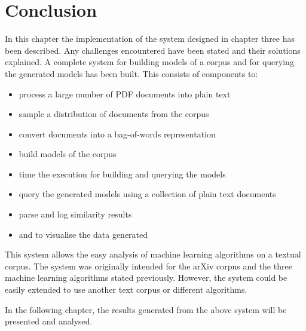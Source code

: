 \section{Conclusion}
In this chapter the implementation of the system designed in chapter three has been described.
Any challenges encountered have been stated and their solutions explained.
A complete system for building models of a corpus and for querying the generated models has been built.
This consists of components to:
\begin{itemize}
    \item process a large number of PDF documents into plain text
    \item sample a distribution of documents from the corpus
    \item convert documents into a bag-of-words representation
    \item build models of the corpus
    \item time the execution for building and querying the models
    \item query the generated models using a collection of plain text documents
    \item parse and log similarity results
    \item and to visualise the data generated
\end{itemize}
This system allows the easy analysis of machine learning algorithms on a textual corpus.
The system was originally intended for the arXiv corpus and the three machine learning algorithms stated previously. However, the system could be easily extended to use another text corpus or different algorithms.

In the following chapter, the results generated from the above system will be presented and analysed.
